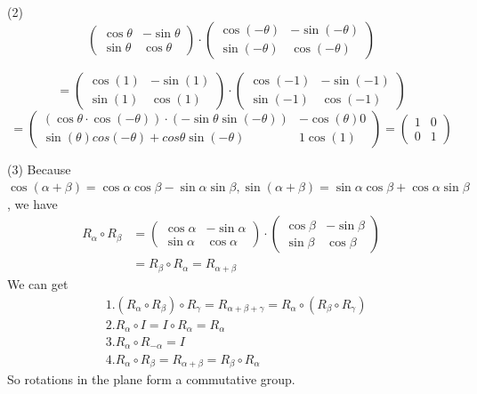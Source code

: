 \documentclass[12pt]{article}
\begin{document}
\medskip
(2)
\[
\begin{pmatrix}
\cos\theta & -\sin\theta \\
\sin\theta & \cos\theta
\end{pmatrix}
\cdot
\begin{pmatrix}
\cos(-\theta) & -\sin(-\theta) \\
\sin(-\theta) & \cos(-\theta)
\end{pmatrix}
\]

\[
=
\begin{pmatrix}
\cos(1) & -\sin(1) \\
\sin(1) & \cos(1)
\end{pmatrix}
\cdot
\begin{pmatrix}
\cos(-1) & -\sin(-1) \\
\sin(-1) & \cos(-1)
\end{pmatrix}
\]
\[
=
\begin{pmatrix}
(\cos\theta \cdot \cos(-\theta)) \cdot (-\sin\theta \sin(-\theta)) & -\cos(\theta)0 \\
\sin(\theta)cos(-\theta)+cos\theta \sin(-\theta) & 1\cos(1)
\end{pmatrix}
=
\begin{pmatrix}
1 & 0 \\
0 & 1
\end{pmatrix}
\]

\medskip
(3) Because $
\cos(\alpha + \beta) = \cos \alpha \cos \beta  - \sin \alpha \sin \beta,
\sin(\alpha + \beta) = \sin \alpha \cos \beta + \cos \alpha \sin \beta
$, we have 
\begin{align*}
R_{\alpha} \circ R_{\beta} &= 
\begin{pmatrix}
\cos\alpha & -\sin\alpha \\
\sin\alpha & \cos\alpha
\end{pmatrix} 
\cdot
\begin{pmatrix}
\cos\beta & -\sin\beta \\
\sin\beta & \cos\beta
\end{pmatrix} \\
&= R_{\beta} \circ R_{\alpha} 
= R_{\alpha + \beta}
\end{align*}
We can get 
\begin{align*}
&1. (R_{\alpha} \circ R_{\beta}) \circ R_{\gamma} = R_{\alpha + \beta + \gamma} = R_{\alpha} \circ (R_{\beta} \circ R_{\gamma}) \\
&2. R_{\alpha} \circ I = I \circ R_{\alpha} = R_{\alpha} \\
&3. R_{\alpha} \circ R_{-\alpha} = I \\
&4. R_{\alpha} \circ R_{\beta} = R_{\alpha + \beta} = R_{\beta} \circ R_{\alpha}
\end{align*}
So rotations in the plane form a commutative group.
\end{document}
